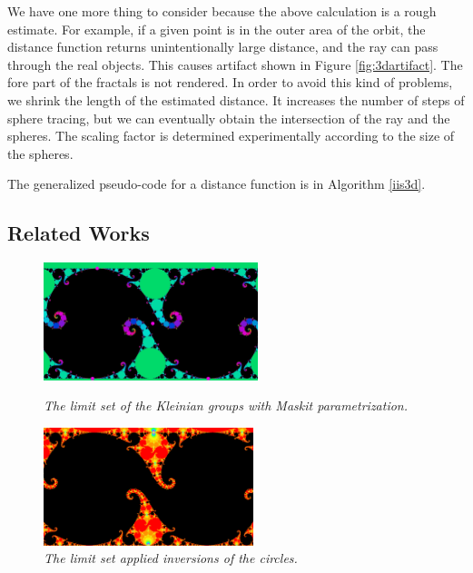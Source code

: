 We have one more thing to consider because the above calculation is
a rough estimate.
For example, if a given point is in the outer area of the orbit, the
distance function returns unintentionally large distance, and the ray
can pass through the real objects. This causes artifact shown in Figure
\ref{fig:3dartifact}. The fore part of the fractals is not rendered.
In order to avoid this kind of problems, we shrink the length of
the estimated distance.
It increases the number of steps of sphere tracing, but we can
eventually obtain the intersection of the ray and the spheres.
The scaling factor is determined experimentally according to the size of
the spheres.

The generalized pseudo-code for a distance function is in Algorithm \ref{iis3d}. 

\subsection{Related Works}

\begin{figure}[htbp]
 \begin{minipage}[t]{0.5\hsize}
  \center
  \includegraphics[height=1.35in, keepaspectratio]{img/preparation/related/josklein.png}
  \caption{\textit{The limit set of the Kleinian groups with Maskit parametrization.}}
  \label{fig:jos}
  \hspace*{\fill}
 \end{minipage}
 \begin{minipage}[t]{0.5\hsize}
  \center
  \includegraphics[height=1.35in, keepaspectratio]{img/preparation/related/joskleinInv.png}
  \caption{\textit{The limit set applied inversions of the circles.}}
  \label{fig:josInv}
  \hspace*{\fill}
 \end{minipage}
\end{figure}

